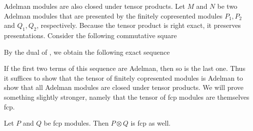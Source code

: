Adelman modules are also closed under tensor products.
Let $M$ and $N$ be two Adelman modules that are presented by the finitely copresented modules $P_1, P_2$ and $Q_1, Q_2$, respectively.
Because the tensor product is right exact, it preserves presentations.
Consider the following commutative square
\begin{center}
\end{center}
By the dual of , we obtain the following exact sequence
\begin{center}
\end{center}
If the first two terms of this sequence are Adelman, then so is the last one.
Thus it suffices to show that the tensor of finitely copresented modules is Adelman to show that all Adelman modules are closed under tensor products.
We will prove something slightly stronger, namely that the tensor of fcp modules are themselves fcp.

\begin{lemma}
  Let $P$ and $Q$ be fcp modules.
  Then $P \otimes Q$ is fcp as well.
\end{lemma}

